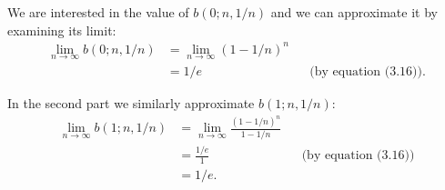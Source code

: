 We are interested in the value of $b(0;n,1/n)$ and we can approximate it by examining its limit:
\begin{align*}
    \lim_{n\to\infty}b(0;n,1/n) &= \lim_{n\to\infty}(1-1/n)^n \\
    &= 1/e && \text{(by equation (3.16))}.
\end{align*}

In the second part we similarly approximate $b(1;n,1/n)$:
\begin{align*}
    \lim_{n\to\infty}b(1;n,1/n) &= \lim_{n\to\infty}\frac{(1-1/n)^n}{1-1/n} \\
    &= \frac{1/e}{1} && \text{(by equation (3.16))} \\[1mm]
    &= 1/e.
\end{align*}
